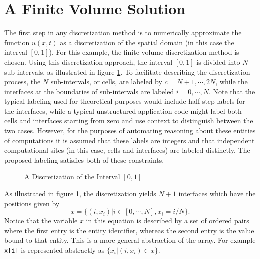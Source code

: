 \documentclass[10pt,epsf,letterpaper,twoside]{book}
\begin{document}
\section{A Finite Volume Solution}

The first step in any discretization method is to numerically
approximate the function $u(x,t)$ as a discretization of the
spatial domain (in this case the interval $[0,1]$).  For this example,
the finite-volume discretization method is chosen.  Using
this discretization approach, the interval $[0,1]$ is divided into $N$
sub-intervals, as illustrated in figure \ref{fig3:oned}.  To
facilitate describing the discretization process, the $N$
sub-intervals, or cells, are labeled by $c = N+1, \cdots, 2N$, while
the interfaces at the boundaries of sub-intervals are labeled $i = 0,
\cdots, N$.  Note that the typical labeling used for theoretical
purposes would include half step labels for the interfaces, while a
typical unstructured application code might label both cells and
interfaces starting from zero and use context to distinguish between
the two cases.  However, for the purposes of automating reasoning
about these entities of computations it is assumed that these labels
are integers and that independent computational sites (in this case,
cells and interfaces) are labeled distinctly.  The proposed labeling
satisfies both of these constraints.

\begin{figure}[htbp]
 \centerline{
  \epsfxsize=5.50in
  }
 \caption{A Discretization of the Interval $[0,1]$}
 \label{fig3:oned}
\end{figure}

As illustrated in figure \ref{fig3:oned}, the discretization yields
$N+1$ interfaces which have the positions given by
\begin{equation}
x = \lbrace (i,x_i) | i \in [0, \cdots, N], x_i = i/N \rbrace.
\label{eq3:interfacex}
\end{equation}
Notice that the variable $x$ in this equation is described by a set of
ordered pairs where the first entry is the entity identifier, whereas
the second entry is the value bound to that entity.  This is a more
general abstraction of the array.  For example {\tt x[i]} is
represented abstractly as $\lbrace x_i | (i,x_i) \in x \rbrace$.
\end{document}
